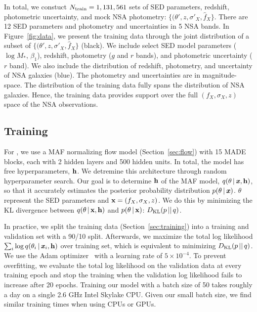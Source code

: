 In total, we constuct $N_{\rm train} = 1,131,561$ sets of SED parameters,
redshift, photometric uncertainty, and mock NSA photometry: 
$\{(\theta', z, \sigma'_X, \hat{f}_X \}$.
There are 12 SED parameters and photometry and uncertainties in 5 NSA bands. 
In Figure~\ref{fig:data}, we present the training data through the joint
distribution of a subset of $\{(\theta', z, \sigma'_X, \hat{f}_X \}$ (black).
We include select SED model parameters ($\log M_*$, $\beta_1$), redshift,
photometry ($g$ and $r$ bands), and photometric uncertainty ($r$ band).
We also include the distribution of redshift, photometry, and uncertainty of
NSA galaxies (blue).
The photometry and uncertainties are in magnitude-space. 
The distribution of the training data fully spans the distribution of NSA
galaxies.
Hence, the training data provides support over the full $(f_X, \sigma_X, z)$
space of the NSA observations. 

\subsection{Training \sedflow} \label{sec:anpe_train}
For \sedflow, we use a MAF normalizing flow model (Section~\ref{sec:flow}) with 
15 MADE blocks, each with 2 hidden layers and 500 hidden units.
In total, the model has  free hyperparameters, ${\bf h}$. 
We detremine this architecture through random hyperparameter search. 
Our goal is to determine ${\bf h}$ of the MAF model, 
$q(\theta\,|\,\textbf{\textit{x}}, {\bf h})$, so that it accurately estimates the
posterior probability distribution $p(\theta\,|\,\textbf{\textit{x}})$. 
$\theta$ represent the SED parameters and ${\bf x} = (f_X, \sigma_X, z)$.
We do this by minimizing the KL divergence between 
$q(\theta\,|\,{\bf x}, {\bf h})$ and $p(\theta\,|\,{\bf x})$:
$D_{\rm KL} (p\,||\,q)$. 

In practice, we split the training data (Section~\ref{sec:training}) into a
training and validation set with a 90/10 split. 
Afterwards, we maximize the total log likelihood $\sum_i \log q(\theta_i\,|\,
\textbf{\textit{x}}_i, \bf{h})$ over training set, which is equivalent to minimizing 
$D_{\rm KL} (p\,||\,q)$.
We use the {\sc Adam} optimizer~\citep{kingma2017} with a learning rate of $5\times10^{-4}$. 
To prevent overfitting, we evaluate the total log likelihood on the validation
data at every training epoch and stop the training when the validation log
likelihood fails to increase after 20 epochs.  
Training our model with a batch size of 50 takes roughly a day on a single 2.6
GHz Intel Skylake CPU. 
Given our small batch size, we find similar training times when using CPUs or
GPUs. 

